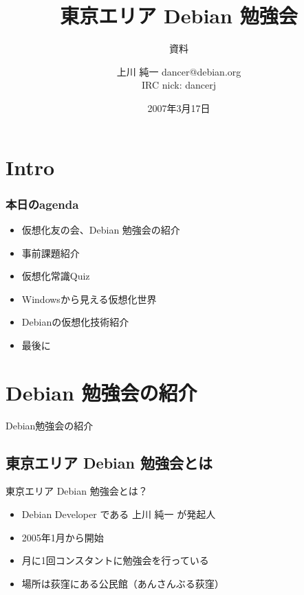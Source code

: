 \documentclass[cjk,dvipdfmx]{beamer}
\title{東京エリア Debian 勉強会}
\subtitle{資料}
\author{上川 純一 dancer@debian.org\\IRC nick: dancerj}
\date{2007年3月17日}
\begin{document}
\frame{\titlepage{}}

\section{Intro}

\begin{frame}
 \frametitle{本日のagenda}
\begin{minipage}[t]{0.4\hsize}
  \begin{itemize}
   \item 仮想化友の会、Debian 勉強会の紹介
   \item 事前課題紹介
   \item 仮想化常識Quiz
 \end{itemize}
\end{minipage} 
\begin{minipage}[t]{0.4\hsize}
 \begin{itemize}
   \item Windowsから見える仮想化世界
   \item Debianの仮想化技術紹介
   \item 最後に
 \end{itemize}
\end{minipage}
\end{frame}

\section{Debian 勉強会の紹介}
\begin{frame}{}

{Debian勉強会の紹介}
 
\end{frame}

\subsection{東京エリア Debian 勉強会とは}

\begin{frame}{東京エリア Debian 勉強会とは？}
\begin{itemize}
  \item<1-> Debian Developer である 上川 純一 が発起人
  \item<2-> 2005年1月から開始
  \item<3-> 月に1回コンスタントに勉強会を行っている
  \item<4-> 場所は荻窪にある公民館（あんさんぶる荻窪）
\end{itemize}
\end{frame}
\end{document}
